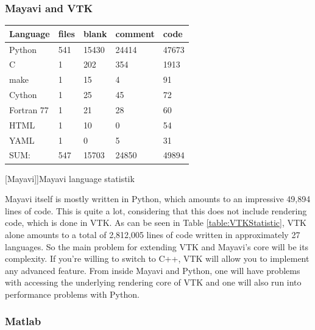 \subsubsection{Mayavi and VTK}
\begin{table}[htbp]
    \centering
    \begin{tabular}{l|l|l|l|l}
        \hline
        \textbf{Language} &    \textbf{files} &    \textbf{blank} &  \textbf{comment} &  \textbf{code}\\
        \hline
        Python          &               541      &    15430     &    24414   &       47673\\
        C               &                 1      &     202      &      354   &      1913\\
        make            &                 1      &       15     &         4  &        91\\
        Cython          &                 1      &       25     &        45  &        72\\
        Fortran 77      &                 1      &       21     &        28  &        60\\
        HTML            &                 1      &       10     &         0  &        54\\
        YAML            &                 1      &        0     &        5   &       31\\
        \hline
        SUM:            &               547       &   15703     &     24850  &       49894\\
        \hline
        \end{tabular}
    [Mayavi]]{Mayavi language statistik}
    \label{table:mayavistatistic}
\end{table}

Mayavi itself is mostly written in Python, which amounts to an impressive 49,894 lines of code. This is quite a lot, considering that this does not include rendering code, which is done in VTK.
As can be seen in Table \ref{table:VTKStatistic}, VTK alone amounts to a total of 2,812,005 lines of code written in approximately 27 languages. 
So the main problem for extending VTK and Mayavi's core will be its complexity. If you're willing to switch to C++, VTK will allow you to implement any advanced feature. From inside Mayavi and Python, one will have problems with accessing the underlying rendering core of VTK and one will also run into performance problems with Python.


\subsubsection{Matlab}

